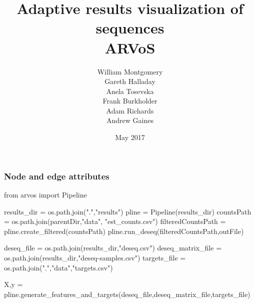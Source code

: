 \documentclass[table,dvipsnames]{beamer}
\title[ARVoS]{Adaptive results visualization of sequences \\ ARVoS}
\author[]{William Montgomery\\ Gareth Halladay \\ Anela Tosevska \\ Frank Burkholder \\ Adam Richards \\ Andrew Gaines}
\date[]{May 2017}
\begin{document}
\frame{\titlepage}



\begin{frame}[fragile]
\frametitle{Node and edge attributes}
\begin{code}

from arvos import Pipeline

results_dir = os.path.join(".","results")
pline = Pipeline(results_dir)
countsPath = os.path.join(parentDir,"data", "est_counts.csv")
filteredCountsPath = pline.create_filtered(countsPath)
pline.run_deseq(filteredCountsPath,outFile)

deseq_file = os.path.join(results_dir,"deseq.csv")
deseq_matrix_file = os.path.join(results_dir,"deseq-samples.csv")
targets_file = os.path.join(".","data","targets.csv")

X,y = pline.generate_features_and_targets(deseq_file,deseq_matrix_file,targets_file)

\end{code}
\end{frame}
\end{document}
